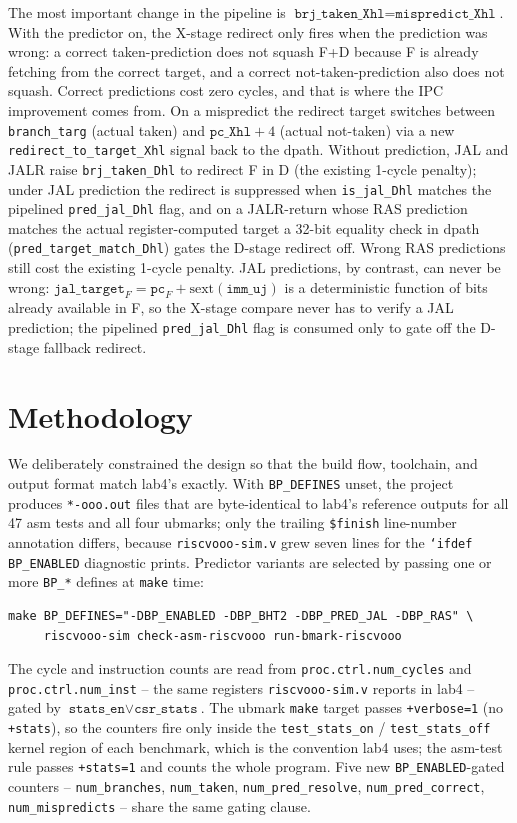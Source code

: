 \documentclass[10pt]{article}
\begin{document}
The most important change in the pipeline is
$\texttt{brj\_taken\_Xhl} = \texttt{mispredict\_Xhl}$. With the
predictor on, the X-stage redirect only fires when the prediction was
wrong: a correct taken-prediction does not squash F+D because F is
already fetching from the correct target, and a correct
not-taken-prediction also does not squash. Correct predictions cost
zero cycles, and that is where the IPC improvement comes from. On a
mispredict the redirect target switches between \texttt{branch\_targ}
(actual taken) and $\texttt{pc\_Xhl}+4$ (actual not-taken) via a new
\texttt{redirect\_to\_target\_Xhl} signal back to the dpath. Without
prediction, JAL and JALR raise \texttt{brj\_taken\_Dhl} to redirect
F in D (the existing 1-cycle penalty); under JAL prediction the
redirect is suppressed when \texttt{is\_jal\_Dhl} matches the
pipelined \texttt{pred\_jal\_Dhl} flag, and on a JALR-return whose
RAS prediction matches the actual register-computed target a 32-bit
equality check in dpath (\texttt{pred\_target\_match\_Dhl}) gates the
D-stage redirect off. Wrong RAS predictions still cost the existing
1-cycle penalty. JAL predictions, by contrast, can never be wrong:
$\texttt{jal\_target}_F = \texttt{pc}_F + \text{sext}(\texttt{imm\_uj})$
is a deterministic function of bits already available in F, so the
X-stage compare never has to verify a JAL prediction; the pipelined
\texttt{pred\_jal\_Dhl} flag is consumed only to gate off the
D-stage fallback redirect.

\section{Methodology}

We deliberately constrained the design so that the build flow,
toolchain, and output format match lab4's exactly. With
\texttt{BP\_DEFINES} unset, the project produces \texttt{*-ooo.out}
files that are byte-identical to lab4's reference outputs for all
47 asm tests and all four ubmarks; only the trailing
\texttt{\$finish} line-number annotation differs, because
\texttt{riscvooo-sim.v} grew seven lines for the
\texttt{`ifdef BP\_ENABLED} diagnostic prints. Predictor variants
are selected by passing one or more \texttt{BP\_*} defines at
\texttt{make} time:
\begin{verbatim}
make BP_DEFINES="-DBP_ENABLED -DBP_BHT2 -DBP_PRED_JAL -DBP_RAS" \
     riscvooo-sim check-asm-riscvooo run-bmark-riscvooo
\end{verbatim}

The cycle and instruction counts are read from
\texttt{proc.ctrl.num\_cycles} and \texttt{proc.ctrl.num\_inst} --
the same registers \texttt{riscvooo-sim.v} reports in lab4 -- gated
by $\texttt{stats\_en} \lor \texttt{csr\_stats}$. The ubmark
\texttt{make} target passes \texttt{+verbose=1} (no \texttt{+stats}),
so the counters fire only inside the \texttt{test\_stats\_on} /
\texttt{test\_stats\_off} kernel region of each benchmark, which is
the convention lab4 uses; the asm-test rule passes \texttt{+stats=1}
and counts the whole program. Five new \texttt{BP\_ENABLED}-gated
counters -- \texttt{num\_branches}, \texttt{num\_taken},
\texttt{num\_pred\_resolve}, \texttt{num\_pred\_correct},
\texttt{num\_mispredicts} -- share the same gating clause.
\end{document}
